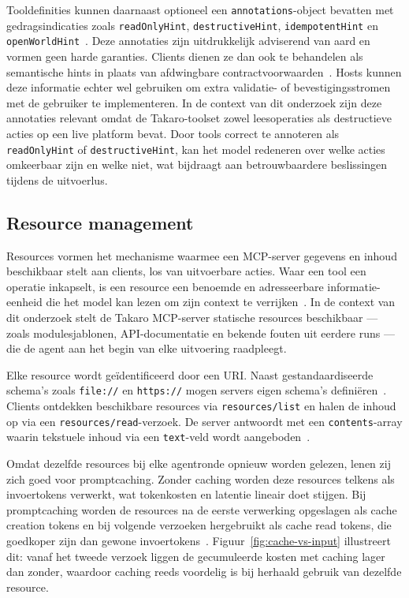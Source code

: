 Tooldefinities kunnen daarnaast optioneel een \texttt{annotations}-object bevatten met gedragsindicaties zoals \texttt{readOnlyHint}, \texttt{destructiveHint}, \texttt{idempotentHint} en \texttt{openWorldHint}~\cite{Hasan2025MCPFirstGlance}. Deze annotaties zijn uitdrukkelijk adviserend van aard en vormen geen harde garanties. Clients dienen ze dan ook te behandelen als semantische hints in plaats van afdwingbare contractvoorwaarden~\cite{mcpspec2025}. Hosts kunnen deze informatie echter wel gebruiken om extra validatie- of bevestigingsstromen met de gebruiker te implementeren. In de context van dit onderzoek zijn deze annotaties relevant omdat de Takaro-toolset zowel leesoperaties als destructieve acties op een live platform bevat. Door tools correct te annoteren als \texttt{readOnlyHint} of \texttt{destructiveHint}, kan het model redeneren over welke acties omkeerbaar zijn en welke niet, wat bijdraagt aan betrouwbaardere beslissingen tijdens de uitvoerlus.

\subsection{Resource management}\label{subsec:mcp-resources}

Resources vormen het mechanisme waarmee een MCP-server gegevens en inhoud beschikbaar stelt aan clients, los van uitvoerbare acties. Waar een tool een operatie inkapselt, is een resource een benoemde en adresseerbare informatie-eenheid die het model kan lezen om zijn context te verrijken~\cite{mcpspec2025}. In de context van dit onderzoek stelt de Takaro MCP-server statische resources beschikbaar — zoals modulesjablonen, API-documentatie en bekende fouten uit eerdere runs — die de agent aan het begin van elke uitvoering raadpleegt.

Elke resource wordt geïdentificeerd door een URI. Naast gestandaardiseerde schema's zoals \texttt{file://} en \texttt{https://} mogen servers eigen schema's definiëren~\cite{Sekar2026MCP}. Clients ontdekken beschikbare resources via \texttt{resources/list} en halen de inhoud op via een \texttt{resources/read}-verzoek. De server antwoordt met een \texttt{contents}-array waarin tekstuele inhoud via een \texttt{text}-veld wordt aangeboden~\cite{mcpspec2025}.

Omdat dezelfde resources bij elke agentronde opnieuw worden gelezen, lenen zij zich goed voor promptcaching. Zonder caching worden deze resources telkens als invoertokens verwerkt, wat tokenkosten en latentie lineair doet stijgen. Bij promptcaching worden de resources na de eerste verwerking opgeslagen als cache creation tokens en bij volgende verzoeken hergebruikt als cache read tokens, die goedkoper zijn dan gewone invoertokens~\cite{mcpspec2025}. Figuur~\ref{fig:cache-vs-input} illustreert dit: vanaf het tweede verzoek liggen de gecumuleerde kosten met caching lager dan zonder, waardoor caching reeds voordelig is bij herhaald gebruik van dezelfde resource.

